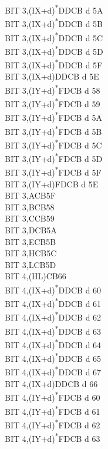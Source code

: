 \documentclass[twoside,openright,a4paper]{book}
\begin{document}
\begin{multicols}{3}
{\begin{tabbing}
	BIT 3,(IX+d)\textsuperscript{*}\>DDCB d 5A\\
	BIT 3,(IX+d)\textsuperscript{*}\>DDCB d 5B\\
	BIT 3,(IX+d)\textsuperscript{*}\>DDCB d 5C\\
	BIT 3,(IX+d)\textsuperscript{*}\>DDCB d 5D\\
	BIT 3,(IX+d)\textsuperscript{*}\>DDCB d 5F\\
	BIT 3,(IX+d)\>DDCB d 5E\\
	BIT 3,(IY+d)\textsuperscript{*}\>FDCB d 58\\
	BIT 3,(IY+d)\textsuperscript{*}\>FDCB d 59\\
	BIT 3,(IY+d)\textsuperscript{*}\>FDCB d 5A\\
	BIT 3,(IY+d)\textsuperscript{*}\>FDCB d 5B\\
	BIT 3,(IY+d)\textsuperscript{*}\>FDCB d 5C\\
	BIT 3,(IY+d)\textsuperscript{*}\>FDCB d 5D\\
	BIT 3,(IY+d)\textsuperscript{*}\>FDCB d 5F\\
	BIT 3,(IY+d)\>FDCB d 5E\\
	BIT 3,A\>CB5F\\
	BIT 3,B\>CB58\\
	BIT 3,C\>CB59\\
	BIT 3,D\>CB5A\\
	BIT 3,E\>CB5B\\
	BIT 3,H\>CB5C\\
	BIT 3,L\>CB5D\\
	BIT 4,(HL)\>CB66\\
	BIT 4,(IX+d)\textsuperscript{*}\>DDCB d 60\\
	BIT 4,(IX+d)\textsuperscript{*}\>DDCB d 61\\
	BIT 4,(IX+d)\textsuperscript{*}\>DDCB d 62\\
	BIT 4,(IX+d)\textsuperscript{*}\>DDCB d 63\\
	BIT 4,(IX+d)\textsuperscript{*}\>DDCB d 64\\
	BIT 4,(IX+d)\textsuperscript{*}\>DDCB d 65\\
	BIT 4,(IX+d)\textsuperscript{*}\>DDCB d 67\\
	BIT 4,(IX+d)\>DDCB d 66\\
	BIT 4,(IY+d)\textsuperscript{*}\>FDCB d 60\\
	BIT 4,(IY+d)\textsuperscript{*}\>FDCB d 61\\
	BIT 4,(IY+d)\textsuperscript{*}\>FDCB d 62\\
	BIT 4,(IY+d)\textsuperscript{*}\>FDCB d 63\\

\end{tabbing}}
\end{multicols}
\end{document}
